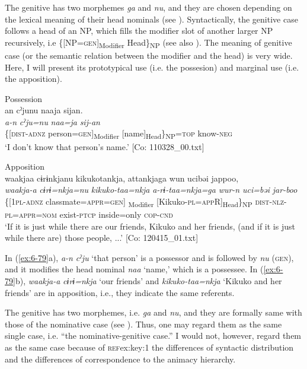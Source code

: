 The genitive has two morphemes \textit{ga} and \textit{nu}, and they are chosen depending on the lexical meaning of their head nominals (see ). Syntactically, the genitive case follows a head of an NP, which fills the modifier slot of another larger NP recursively, i.e \{[NP=\textsc{gen}]\textsubscript{Modifier} Head\}\textsubscript{NP} (see also ). The meaning of genitive case (or the semantic relation between the modifier and the head) is very wide. Here, I will present its prototypical use (i.e. the possesion) and marginal use (i.e. the apposition).

\ea\label{ex:6-79}
\ea Possession\\
{\TM}
\glll  an  cˀjunu  naaja  sijan.\\
\textit{a-n}  \textit{cˀju=nu}  \textit{naa=ja}  \textit{sij-an}\\
\{[\textsc{dist}-\textsc{adnz}  person=\textsc{gen}]\textsubscript{Modifier}  [name]\textsubscript{Head}\}\textsubscript{NP}=\textsc{top}  know-\textsc{neg}\\
\glt ‘I don’t know that person’s name.’ [Co: 110328\_00.txt]
\z

\ex Apposition\\
{\TM}
\glll  waakjaa  cɨrɨnkjanu  kikukotankja,    attankjaga  wun  ucibəi  jappoo,\\
\textit{waakja-a}  \textit{cɨrɨ=nkja=nu}  \textit{kikuko-taa=nkja}    \textit{a-rɨ-taa=nkja=ga}  \textit{wur-n}  \textit{uci=bəi}  \textit{jar-boo}\\
\{[1\textsc{pl}-\textsc{adnz}  classmate=\textsc{appr}=\textsc{gen}]\textsubscript{ Modifier}  [Kikuko-\textsc{pl}=\textsc{app}R]\textsubscript{Head}\}\textsubscript{NP}  \textsc{dist}-\textsc{nlz}-\textsc{pl}=\textsc{appr}=\textsc{nom}  exist-\textsc{ptcp}  inside=only  \textsc{cop}-\textsc{cnd}\\
\glt ‘If it is just while there are our friends, Kikuko and her friends, (and if it is just while there are) those people, ...’ [Co: 120415\_01.txt]
\z

In (\ref{ex:6-79}a), \textit{a-n} \textit{cˀju} ‘that person’ is a possessor and is followed by \textit{nu} (\textsc{gen}), and it modifies the head nominal \textit{naa} ‘name,’ which is a possessee. In (\ref{ex:6-79}b), \textit{waakja-a} \textit{cɨrɨ=nkja} ‘our friends’ and \textit{kikuko-taa=nkja} ‘Kikuko and her friends’ are in apposition, i.e., they indicate the same referents.

The genitive has two morphemes, i.e. \textit{ga} and \textit{nu}, and they are formally same with those of the nominative case (see ). Thus, one may regard them as the same single case, i.e. “the nominative-genitive case.” I would not, however, regard them as the same case because of \textsc{ref}{ex:key:1} the differences of syntactic distribution and  the differences of correspondence to the animacy hierarchy.

